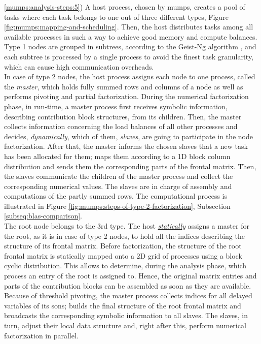 \ref{mumps:analysis-steps:5}) A host process, chosen by \acrshort{mumps}, creates a pool of tasks where each task belongs to one out of three different types, Figure \ref{fig:mumps:mapping-and-scheduling}. Then, the host distributes tasks among all available processes in such a way to achieve good memory and compute balances.\\

 
Type 1 nodes are grouped in subtrees, according to the Geist-Ng algorithm \cite{geist1989task}, and each subtree is processed by a single process to avoid the finest task granularity, which can cause high communication overheads. \\


In case of type 2 nodes, the host process assigns each node to one process, called the \textit{master}, which holds fully summed rows and columns of a node as well as performs pivoting and partial factorization. During the numerical factorization phase, in run-time, a master process first receives symbolic information, describing  contribution block structures, from its children. Then, the master collects information concerning the load balances of all other processes and decides, \underline{\textit{dynamically}},  which of them, \textit{slaves}, are going to participate in the node factorization. After that, the master informs the chosen slaves that a new task has been allocated for them; maps them according to a 1D block column distribution and sends them the corresponding parts of the frontal matrix. Then, the slaves communicate the children of the master process and collect the corresponding numerical values. The slaves are in charge of assembly and computations of the partly summed rows. The computational process is illustrated in Figure \ref{fig:mumps:steps-of-type-2-factorization}, Subsection \ref{subseq:blas-comparison}.\\


The root node belongs to the 3rd type. The host \underline{\textit{statically}} assigns a master for the root, as it is in case of type 2 nodes, to hold all the indices describing the structure of its frontal matrix. Before factorization, the structure of the root frontal matrix is statically mapped onto a 2D grid of processes using a block cyclic distribution. This allows to determine, during the analysis phase, which process an entry of the root is assigned to. Hence, the original matrix entries and parts of the contribution blocks can be assembled as soon as they are available. Because of threshold pivoting, the master process collects indices for all delayed variables of its sons; builds the final structure of the root frontal matrix and broadcasts the corresponding symbolic information to all slaves. The slaves, in turn, adjust their local data structure and, right after this, perform numerical factorization in parallel.\\


